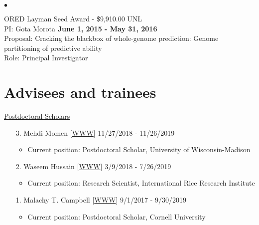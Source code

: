 \documentclass[margin,line,10pt]{res}
\newenvironment{list2}{
  \begin{list}{$\bullet$}{%
      \setlength{\itemsep}{0in}
      \setlength{\parsep}{0in} \setlength{\parskip}{0in}
      \setlength{\topsep}{0in} \setlength{\partopsep}{0in} 
      \setlength{\leftmargin}{0.2in}}}{\end{list}}
\begin{document}
\begin{resume}
\begin{list2}
\vspace{0.5cm}

\item ORED Layman Seed Award - \$9,910.00  \hfill UNL\\
PI: Gota Morota   \hfill \textbf{June 1, 2015 - May 31, 2016}\\
Proposal: Cracking the blackbox of whole-genome prediction: Genome partitioning of predictive ability \\
Role: Principal Investigator \\


\end{list2}



\vspace{0.5cm}
\section{\sc Advisees and trainees}

\begin{flushleft}
\hspace{0.2cm} \underline{Postdoctoral Scholars}
\end{flushleft}
\begin{enumerate}
  
\item [3.] Mehdi Momen [\textcolor{blue}{\href{https://mehdimomen.github.io/}{WWW}}]  \hfill 11/27/2018 - 11/26/2019
  \begin{itemize} 
  \item Current position: Postdoctoral Scholar, University of Wisconsin-Madison 
  \end{itemize}
  
  \vspace{0.3cm}
  
\item [2.] Waseem Hussain  [\textcolor{blue}{\href{https://whussain2.github.io/}{WWW}}]  \hfill 3/9/2018 - 7/26/2019
  \begin{itemize} 
  \item Current position: Research Scientist, International Rice Research Institute
  \end{itemize}
   
  \vspace{0.3cm}
  
\item [1.] Malachy T. Campbell  [\textcolor{blue}{\href{https://malachycampbell.github.io/}{WWW}}]  \hfill  9/1/2017 - 9/30/2019
  \begin{itemize} 
  \item Current position: Postdoctoral Scholar, Cornell University 
  \end{itemize}
\end{enumerate}




\end{resume}
\end{document}
